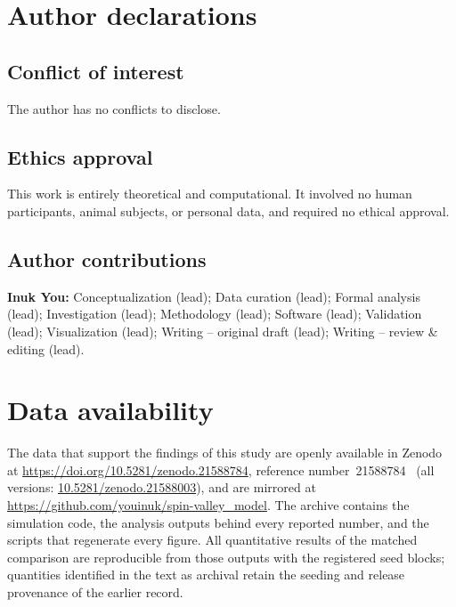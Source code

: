 \documentclass[aip,jap,reprint,superscriptaddress,longbibliography,floatfix]{revtex4-2}
\begin{document}
\section*{Author declarations}
\subsection*{Conflict of interest}
The author has no conflicts to disclose.

\subsection*{Ethics approval}
This work is entirely theoretical and computational. It involved no human
participants, animal subjects, or personal data, and required no ethical
approval.

\subsection*{Author contributions}
\textbf{Inuk You:} Conceptualization (lead); Data curation (lead); Formal
analysis (lead); Investigation (lead); Methodology (lead); Software (lead);
Validation (lead); Visualization (lead); Writing -- original draft (lead);
Writing -- review \& editing (lead).

\section*{Data availability}
The data that support the findings of this study are openly available in
Zenodo at
\href{https://doi.org/10.5281/zenodo.21588784}{https://doi.org/10.5281/zenodo.21588784},
reference number~21588784~\cite{you_reproducibility_2026} (all versions:
\href{https://doi.org/10.5281/zenodo.21588003}{10.5281/zenodo.21588003}), and
are mirrored at \url{https://github.com/youinuk/spin-valley_model}. The
archive contains the simulation code, the analysis outputs behind every
reported number, and the scripts that regenerate every figure. All quantitative
results of the matched comparison are reproducible from those outputs with the
registered seed blocks; quantities identified in the text as archival retain
the seeding and release provenance of the earlier record.



\end{document}
